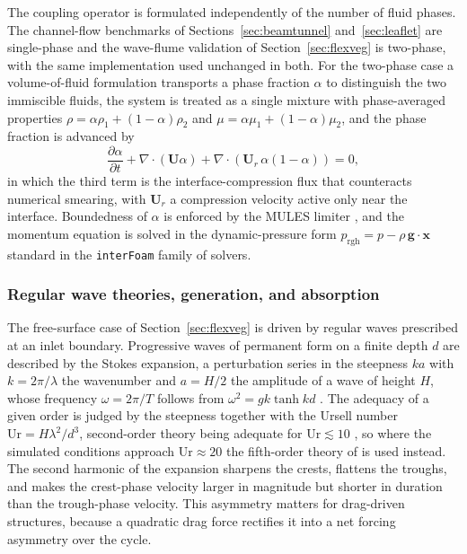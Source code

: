 \noindent
The coupling operator is formulated independently of the number of fluid phases. The channel-flow benchmarks of Sections~\ref{sec:beamtunnel} and~\ref{sec:leaflet} are single-phase and the wave-flume validation of Section~\ref{sec:flexveg} is two-phase, with the same implementation used unchanged in both. For the two-phase case a volume-of-fluid formulation transports a phase fraction $\alpha$ to distinguish the two immiscible fluids, the system is treated as a single mixture with phase-averaged properties $\rho = \alpha \rho_1 + (1-\alpha)\rho_2$ and $\mu = \alpha \mu_1 + (1-\alpha)\mu_2$, and the phase fraction is advanced by
\begin{equation}
\frac{\partial \alpha}{\partial t}
+ \nabla \cdot (\mathbf{U}\alpha)
+ \nabla \cdot \left(\mathbf{U}_r\,\alpha(1-\alpha)\right) = 0,
\label{eq:alphaTransportCompressed}
\end{equation}
in which the third term is the interface-compression flux that counteracts numerical smearing, with $\mathbf{U}_r$ a compression velocity active only near the interface. Boundedness of $\alpha$ is enforced by the MULES limiter \citep{damian_extended_2014}, and the momentum equation is solved in the dynamic-pressure form $p_{\mathrm{rgh}} = p - \rho\,\mathbf{g}\cdot\mathbf{x}$ standard in the \texttt{interFoam} family of solvers.

\subsubsection{Regular wave theories, generation, and absorption}
\label{sec:theory_waves}
The free-surface case of Section~\ref{sec:flexveg} is driven by regular waves prescribed at an inlet boundary. Progressive waves of permanent form on a finite depth $d$ are described by the Stokes expansion, a perturbation series in the steepness $ka$ with $k = 2\pi/\lambda$ the wavenumber and $a = H/2$ the amplitude of a wave of height $H$, whose frequency $\omega = 2\pi/T$ follows from $\omega^2 = g k \tanh kd$ \citep{dean_water_1991}. The adequacy of a given order is judged by the steepness together with the Ursell number $\mathrm{Ur} = H\lambda^2/d^3$, second-order theory being adequate for $\mathrm{Ur} \lesssim 10$ \citep{dean_water_1991}, so where the simulated conditions approach $\mathrm{Ur} \approx 20$ the fifth-order theory of \citet{fenton_fifth_1985} is used instead. The second harmonic of the expansion sharpens the crests, flattens the troughs, and makes the crest-phase velocity larger in magnitude but shorter in duration than the trough-phase velocity. This asymmetry matters for drag-driven structures, because a quadratic drag force rectifies it into a net forcing asymmetry over the cycle.

